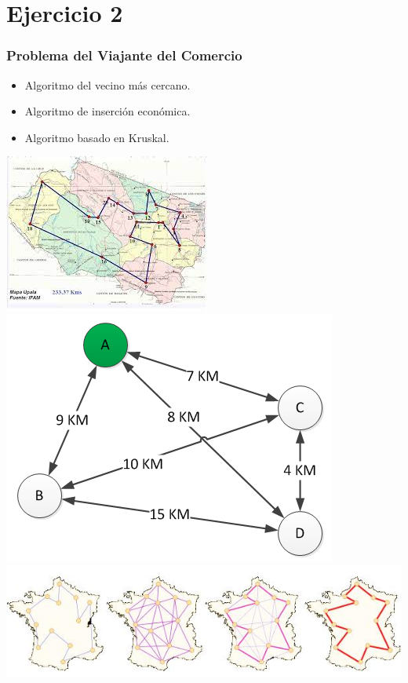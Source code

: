 \documentclass[13pt]{beamer}
\begin{document}
	\section{Ejercicio 2}

    \begin{frame}
		\frametitle{Problema del Viajante del Comercio}

        \begin{itemize}
            \item Algoritmo del vecino más cercano.
            \item Algoritmo de inserción económica.
            \item Algoritmo basado en Kruskal.
        \end{itemize}

		\begin{center}
			\includegraphics[scale=0.35]{../src/PVC.png}
			\includegraphics[scale=0.35]{../src/PVC1.png}
			\includegraphics[scale=0.35]{../src/PVC2.png}
		\end{center}

	\end{frame}
\end{document}
